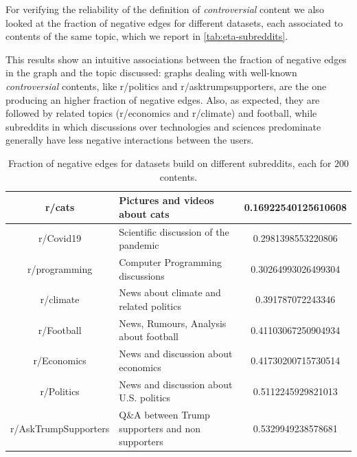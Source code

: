\bigskip
For verifying the reliability of the definition of \emph{controversial} content
we also looked at the fraction of negative edges for different datasets, each
associated to contents of the same topic, which we report in
\autoref{tab:eta-subreddits}.

This results show an intuitive associations between the fraction of negative edges in the
graph and the topic discussed:
graphs dealing with well-known \emph{controversial} contents, like r/politics and
r/asktrumpsupporters, are the one producing an higher fraction of negative
edges. Also, as expected, they are followed by related topics
(r/economics and r/climate) and football, while
subreddits in which discussions over technologies and sciences
predominate generally have less negative interactions between the users.

\begin{table}
	\centering
	\caption[Fraction of negative edges in different subreddits]{Fraction of negative edges for datasets build on different
		subreddits, each for $200$ contents.}
	\label{tab:eta-subreddits}
	{\small
		\begin{tabular}{c | p{6cm} | c}
			r/cats               & Pictures and videos about cats                & \num{0.16922540125610608} \\
			\hline
			r/Covid19            & Scientific discussion of the pandemic         & \num{0.2981398553220806}  \\
			\hline
			r/programming        & Computer Programming discussions              & \num{0.30264993026499304} \\
			\hline
			r/climate            & News about climate and related politics       & \num{0.391787072243346}   \\
			\hline
			r/Football           & News, Rumours, Analysis about \mbox{football} & \num{0.41103067250904934} \\
			\hline
			r/Economics          & News and discussion about economics           & \num{0.41730200715730514} \\
			\hline
			r/Politics           & News and discussion about U.S. politics       & \num{0.5112245929821013}  \\
			\hline
			r/AskTrumpSupporters & {Q\&A between Trump supporters and non
			supporters}          & \num{0.5329949238578681}                                                  \\
		\end{tabular}
	}
\end{table}

